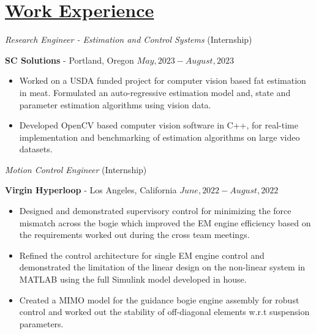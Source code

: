 \section*{\underline{Work Experience}}
\noindent\textit{Research Engineer  - Estimation and Control Systems} (Internship)

\textbf{SC Solutions} - Portland, Oregon \hfill $May, 2023 - August, 2023$

\begin{itemize}
    \item Worked on a USDA funded project for computer vision based fat estimation in meat. Formulated an auto-regressive estimation model and, state and parameter estimation algorithms using vision data.
    \item Developed OpenCV based computer vision software in C++, for real-time implementation and benchmarking of estimation algorithms on large video datasets.
\end{itemize}

\medskip

\noindent \textit{Motion Control Engineer } (Internship)

\textbf{Virgin Hyperloop} - Los Angeles, California \hfill $June, 2022  - August, 2022$

\begin{itemize}
        \item Designed and demonstrated supervisory control for minimizing the force mismatch across the bogie which
        improved the EM engine efficiency based on the requirements worked out during the cross team meetings.
        \item Refined the control architecture for single EM engine control and demonstrated the limitation of the linear design on the non-linear system in MATLAB using the full Simulink model developed in house.
        \item Created a MIMO model for the guidance bogie engine assembly for robust control and worked out the stability of off-diagonal
        elements w.r.t suspension parameters.
\end{itemize}

